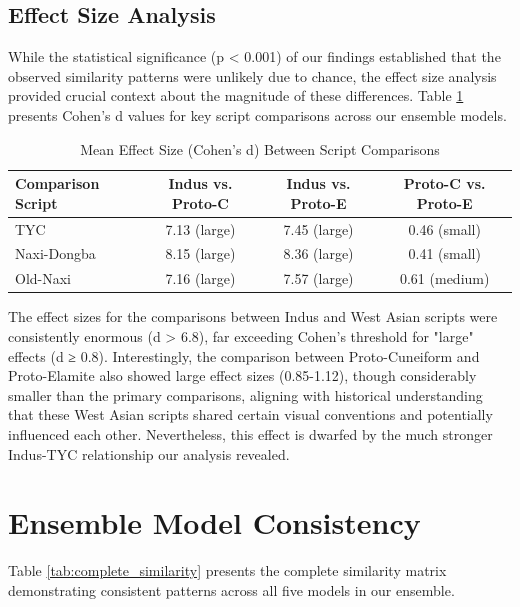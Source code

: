 \documentclass[11pt,a4paper,oneside]{report}
\begin{document}
\subsection{Effect Size Analysis}
\noindent\hspace{1cm}

While the statistical significance (p < 0.001) of our findings established that the observed similarity patterns were unlikely due to chance, the effect size analysis provided crucial context about the magnitude of these differences. Table \ref{tab:effect_size} presents Cohen's d values for key script comparisons across our ensemble models.

\begin{table}[H]
\centering
\caption{Mean Effect Size (Cohen's d) Between Script Comparisons}
\label{tab:effect_size}
\begin{tabular}{lccc}
\hline
\textbf{Comparison Script} & \textbf{Indus vs. Proto-C} & \textbf{Indus vs. Proto-E} & \textbf{Proto-C vs. Proto-E} \\
\hline
TYC & 7.13 (large) & 7.45 (large) & 0.46 (small) \\
Naxi-Dongba & 8.15 (large) & 8.36 (large) & 0.41 (small) \\
Old-Naxi & 7.16 (large) & 7.57 (large) & 0.61 (medium) \\
\hline
\end{tabular}
\end{table}

The effect sizes for the comparisons between Indus and West Asian scripts were consistently enormous (d > 6.8), far exceeding Cohen's threshold for "large" effects (d ≥ 0.8). Interestingly, the comparison between Proto-Cuneiform and Proto-Elamite also showed large effect sizes (0.85-1.12), though considerably smaller than the primary comparisons, aligning with historical understanding that these West Asian scripts shared certain visual conventions and potentially influenced each other. Nevertheless, this effect is dwarfed by the much stronger Indus-TYC relationship our analysis revealed.

\section{Ensemble Model Consistency}
\noindent\hspace{1cm}
Table \ref{tab:complete_similarity} presents the complete similarity matrix demonstrating consistent patterns across all five models in our ensemble.
\end{document}
